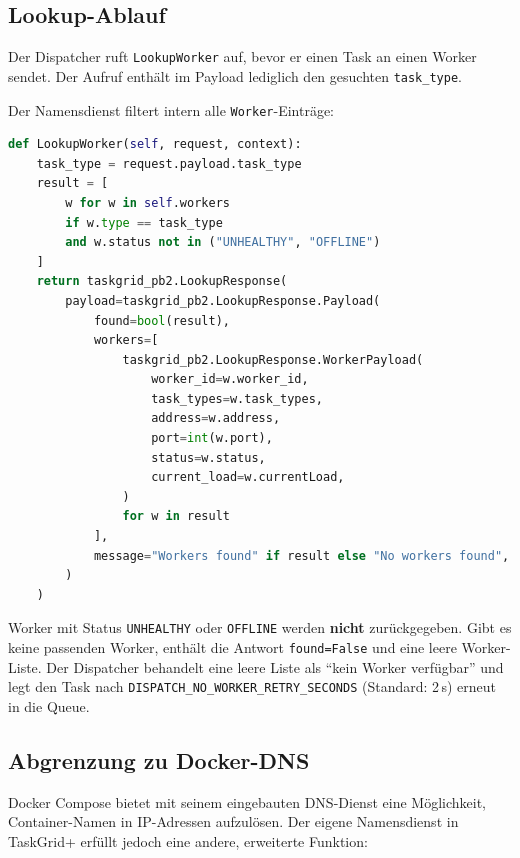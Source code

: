 \subsection{Lookup-Ablauf}
\label{sec:nd-lookup-ablauf}

Der Dispatcher ruft \texttt{LookupWorker} auf, bevor er einen Task
an einen Worker sendet.
Der Aufruf enthält im Payload lediglich den gesuchten \texttt{task\_type}.

\noindent Der Namensdienst filtert intern alle \texttt{Worker}-Einträge:

\begin{lstlisting}[language=Python,caption={LookupWorker-Implementierung (nameservice.py)}]
def LookupWorker(self, request, context):
    task_type = request.payload.task_type
    result = [
        w for w in self.workers
        if w.type == task_type
        and w.status not in ("UNHEALTHY", "OFFLINE")
    ]
    return taskgrid_pb2.LookupResponse(
        payload=taskgrid_pb2.LookupResponse.Payload(
            found=bool(result),
            workers=[
                taskgrid_pb2.LookupResponse.WorkerPayload(
                    worker_id=w.worker_id,
                    task_types=w.task_types,
                    address=w.address,
                    port=int(w.port),
                    status=w.status,
                    current_load=w.currentLoad,
                )
                for w in result
            ],
            message="Workers found" if result else "No workers found",
        )
    )
\end{lstlisting}

\noindent Worker mit Status \texttt{UNHEALTHY} oder \texttt{OFFLINE} werden
\textbf{nicht} zurückgegeben.
Gibt es keine passenden Worker, enthält die Antwort
\texttt{found=False} und eine leere Worker-Liste.
Der Dispatcher behandelt eine leere Liste als
"`kein Worker verfügbar"' und legt den Task nach
\texttt{DISPATCH\_NO\_WORKER\_RETRY\_SECONDS} (Standard: 2\,s) erneut
in die Queue.

\subsection{Abgrenzung zu Docker-DNS}
\label{sec:nd-docker-dns}

Docker Compose bietet mit seinem eingebauten DNS-Dienst eine Möglichkeit,
Container-Namen in IP-Adressen aufzulösen.
Der eigene Namensdienst in TaskGrid+ erfüllt jedoch eine andere,
erweiterte Funktion:

